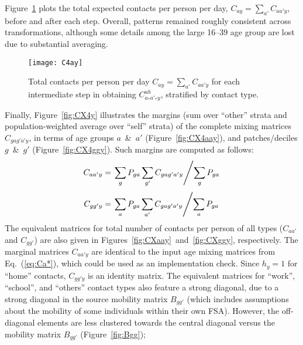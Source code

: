 \par
Figure~\ref{fig:C4Ay} plots the total expected contacts per person per day,
$C_{ay} = \sum_{a'} C_{aa'y}$, before and after each step.
Overall, patterns remained roughly consistent across transformations,
although some details among the large 16--39 age group are lost due to substantial averaging.
\begin{figure}
  \centering
  \texttt{[image: C4ay]}
  \caption{Total contacts per person per day $C_{ay} = \sum_{a'} C_{aa'y}$
    for each intermediate step in obtaining $C^{ub}_{a_*a'_*y}$,
    stratified by contact type.}
  \label{fig:C4Ay}
\end{figure}
\par
Finally, Figure~\ref{fig:CX4y} illustrates the margins
(sum over ``other'' strata and population-weighted average over ``self'' strata)
of the complete mixing matrices $C_{gag'a'y}$, in terms of
age groups $a$~\&~$a'$ (Figure~\ref{fig:CX4aay}), and
patches/deciles $g$~\&~$g'$ (Figure~\ref{fig:CX4ggy}).
Such margins are computed as follows:
\begin{equation}\label{eq:Caay}
  C_{aa'y} = \left.\sum_{g} P_{ga} \sum_{g'} C_{gag'a'y} \middle/ \sum_{g} P_{ga} \right.
\end{equation}
\begin{equation}\label{eq:Cggy}
  C_{gg'y} = \left.\sum_{a} P_{ga} \sum_{a'} C_{gag'a'y} \middle/ \sum_{a} P_{ga} \right.
\end{equation}
The equivalent matrices for total number of contacts per person of all types
($C_{aa'}$ and $C_{gg'}$) are also given in Figures~\ref{fig:CXaay}~and~\ref{fig:CXggy}, respectively.
The marginal matrices $C_{aa'y}$ are identical to the input age mixing matrices from Eq.~(\ref{eq:Ca*}),
which could be used as an implementation check.
Since $h_y = 1$ for ``home'' contacts, $C_{gg'y}$ is an identity matrix.
The equivalent matrices for ``work'', ``school'', and ``others'' contact types
also feature a strong diagonal, due to a strong diagonal in the source mobility matrix $B_{gg'}$
(which includes assumptions about the mobility of some individuals within their own FSA).
However, the off-diagonal elements are less clustered towards the central diagonal
versus the mobility matrix $B_{gg'}$ (Figure~\ref{fig:Bgg});
